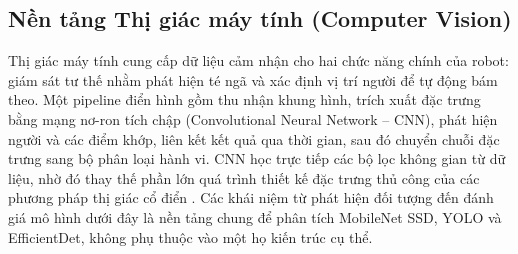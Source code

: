 




\subsection{Nền tảng Thị giác máy tính (Computer Vision)}

Thị giác máy tính cung cấp dữ liệu cảm nhận cho hai chức năng chính của robot: giám sát tư thế nhằm phát hiện té ngã và xác định vị trí người để tự động bám theo. Một pipeline điển hình gồm thu nhận khung hình, trích xuất đặc trưng bằng mạng nơ-ron tích chập (Convolutional Neural Network -- CNN), phát hiện người và các điểm khớp, liên kết kết quả qua thời gian, sau đó chuyển chuỗi đặc trưng sang bộ phân loại hành vi. CNN học trực tiếp các bộ lọc không gian từ dữ liệu, nhờ đó thay thế phần lớn quá trình thiết kế đặc trưng thủ công của các phương pháp thị giác cổ điển . Các khái niệm từ phát hiện đối tượng đến đánh giá mô hình dưới đây là nền tảng chung để phân tích MobileNet SSD, YOLO và EfficientDet, không phụ thuộc vào một họ kiến trúc cụ thể.


